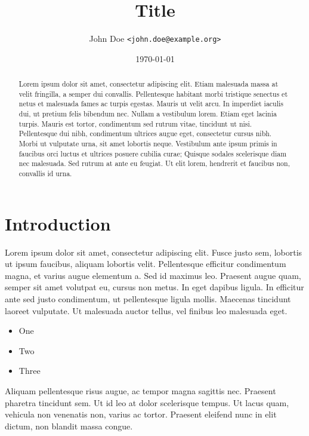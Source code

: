 \documentclass[10pt,a4paper,twoside,twocolumn]{article}
\title{Title}
\author{John Doe \texttt{<john.doe@example.org>}}
\date{\today}
\begin{document}
\maketitle

\begin{abstract}

Lorem ipsum dolor\cite{JS2015} sit amet, consectetur adipiscing\cite{rfc2119} elit. Etiam malesuada massa at velit fringilla, a semper dui convallis. Pellentesque habitant morbi tristique senectus et netus et malesuada fames ac turpis egestas. Mauris ut velit arcu. In imperdiet iaculis dui, ut pretium felis bibendum nec. Nullam a vestibulum lorem. Etiam eget lacinia turpis. Mauris est tortor, condimentum sed rutrum vitae, tincidunt ut nisi. Pellentesque dui nibh, condimentum ultrices augue eget, consectetur cursus nibh. Morbi ut vulputate urna, sit amet lobortis neque. Vestibulum ante ipsum primis in faucibus orci luctus et ultrices posuere cubilia curae; Quisque sodales scelerisque diam nec malesuada. Sed rutrum at ante eu feugiat. Ut elit lorem, hendrerit et faucibus non, convallis id urna.

\end{abstract}

\section{Introduction}

Lorem ipsum dolor sit amet, consectetur adipiscing elit. Fusce justo sem, lobortis ut ipsum faucibus, aliquam lobortis velit. Pellentesque efficitur condimentum magna, et varius augue elementum a. Sed id maximus leo. Praesent augue quam, semper sit amet volutpat eu, cursus non metus. In eget dapibus ligula. In efficitur ante sed justo condimentum, ut pellentesque ligula mollis. Maecenas tincidunt laoreet vulputate. Ut malesuada auctor tellus, vel finibus leo malesuada eget.

\begin{itemize}
	\item One
	\item Two
	\item Three
\end{itemize}

Aliquam pellentesque risus augue, ac tempor magna sagittis nec. Praesent pharetra tincidunt sem. Ut id leo at dolor scelerisque tempus. Ut lacus quam, vehicula non venenatis non, varius ac tortor. Praesent eleifend nunc in elit dictum, non blandit massa congue.
\end{document}
